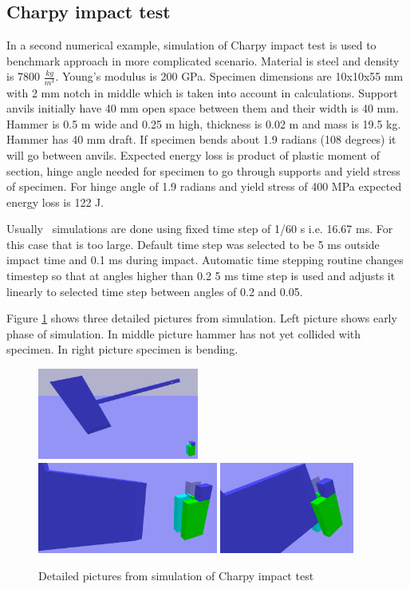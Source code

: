 \subsection{Charpy impact test}
In a second numerical example, simulation of Charpy impact test is
used to benchmark approach in more complicated scenario. 
Material is steel and density is 7800 $\frac{kg}{m^{3}}$. Young’s modulus is 200 GPa.
Specimen dimensions are 10x10x55 mm with 2 mm notch in middle which is taken into account in calculations.
Support anvils initially have 40 mm open space between them and their width is 40 mm. 
Hammer is 0.5 m wide and 0.25 m high, thickness is 0.02 m and mass is 19.5 kg.
Hammer has 40 mm draft.
If specimen bends about 1.9 radians (108 degrees) it will go between anvils.
Expected energy loss is product of plastic moment of section, hinge angle needed for specimen to go through supports and 
yield stress of specimen. For hinge angle of 1.9 radians and yield stress of 400 MPa expected energy 
loss is 122 J.

Usually \bullet\ simulations are done using fixed time step of 1/60 s i.e. 16.67 ms. 
For this case that is too large. 
Default time step was selected to be 5 ms outside impact time and 0.1 ms during impact. 
Automatic time stepping routine changes timestep so that at angles higher than 0.2 5 ms time step is
used and adjusts it linearly to selected time step between angles of 0.2 and 0.05.

Figure \ref{fig:charpy-series} shows three detailed pictures from simulation.
Left picture shows early phase of simulation. In middle picture hammer has not yet collided with specimen.
In right picture specimen is bending.

\begin{figure}[htb!]
\centering
\includegraphics[height=3cm]{figs/article-charpy-1}
\includegraphics[height=3cm]{figs/article-charpy-2}
\includegraphics[height=3cm]{figs/article-charpy-3}
\caption{Detailed pictures from simulation of Charpy impact test}
\label{fig:charpy-series}
\end{figure}

